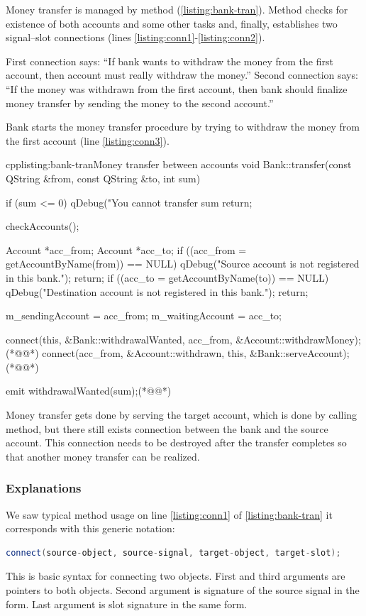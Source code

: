 Money transfer is managed by method (\autoref{listing:bank-tran}). Method checks for existence of both accounts and some other tasks and, finally, establishes two signal--slot connections (lines \ref{listing:conn1}-\ref{listing:conn2}).

First connection says: \enquote{If bank wants to withdraw the money from the first account, then account must really withdraw the money.} Second connection says: \enquote{If the money was withdrawn from the first account, then bank should finalize money transfer by sending the money to the second account.}

Bank starts the money transfer procedure by trying to withdraw the money from the first account (line \ref{listing:conn3}).

\begin{fdoccode}{cpp}{listing:bank-tran}{Money transfer between accounts}
void Bank::transfer(const QString &from, const QString &to, int sum) {
    if (sum <= 0) {
		qDebug("You cannot transfer sum %
		return;
    }

    checkAccounts();

    Account *acc_from;
    Account *acc_to;
    if ((acc_from = getAccountByName(from)) == NULL) {
		qDebug("Source account is not registered in this bank.");
		return;
    }
    if ((acc_to = getAccountByName(to)) == NULL) {
		qDebug("Destination account is not registered in this bank.");
		return;
    }

    m_sendingAccount = acc_from;
    m_waitingAccount = acc_to;

    connect(this, &Bank::withdrawalWanted, acc_from, &Account::withdrawMoney);(*@\label{listing:conn1}@*)
    connect(acc_from, &Account::withdrawn, this, &Bank::serveAccount);(*@\label{listing:conn2}@*)

    emit withdrawalWanted(sum);(*@\label{listing:conn3}@*)
}
\end{fdoccode}

Money transfer gets done by serving the target account, which is done by calling method, but there still exists connection between the bank and the source account. This connection needs to be destroyed after the transfer completes so that another money transfer can be realized.

\subsubsection{Explanations}
We saw typical method usage on line \ref{listing:conn1} of \autoref{listing:bank-tran} it corresponds with this generic notation:
\begin{lstlisting}[firstnumber=1,language=cpp]
connect(source-object, source-signal, target-object, target-slot);
\end{lstlisting}
This is basic syntax for connecting two objects. First and third arguments are pointers to both objects. Second argument is signature of the source signal in the form. Last argument is slot signature in the same form.


